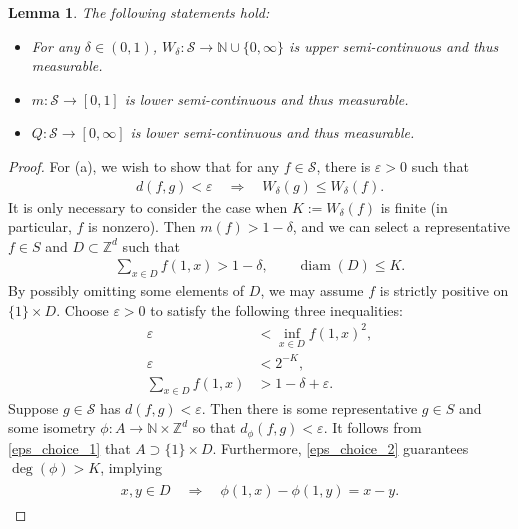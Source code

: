 \documentclass[11pt,reqno]{amsart}
\numberwithin{equation}{section}
\newtheorem{lemma}[thm]{Lemma}
\theoremstyle{definition}
\begin{document}
\begin{lemma} \label{more_equivalences}
The following statements hold:
\begin{itemize}
\item[(a)] For any $\delta \in (0,1)$, $W_\delta: {\mathcal{S}} \to {\mathbb{N}} \cup \{0,\infty\}$ is upper semi-continuous and thus measurable.
\item[(b)] $m : {\mathcal{S}} \to [0,1]$ is lower semi-continuous and thus measurable.
\item[(c)] $Q : {\mathcal{S}} \to [0,\infty]$ is lower semi-continuous and thus measurable.
\end{itemize}
\end{lemma}

\begin{proof}
For (a), we wish to show that for any $f \in {\mathcal{S}}$, there is ${\varepsilon} > 0$ such that
{\begin{align*} {
d(f,g) < {\varepsilon} \quad \Rightarrow \quad W_\delta(g) \leq W_\delta(f).
} \end{align*}}
It is only necessary to consider the case when $K := W_\delta(f)$ is finite (in particular, $f$ is nonzero).
Then $m(f) > 1 - \delta$, and we can select a representative $f \in S$ and $D \subset {\mathbb{Z}}^d$ such that
{\begin{align*} {
\sum_{x \in D} f(1,x) > 1 - \delta, \qquad \operatorname{diam}(D) \leq K.
} \end{align*}}
By possibly omitting some elements of $D$, we may assume $f$ is strictly positive on $\{1\} \times D$.
Choose ${\varepsilon} > 0$ to satisfy the following three inequalities:
\begin{align}
{\varepsilon} &< \inf_{x \in D} f(1,x)^2, \label{eps_choice_1} \\
{\varepsilon} &< 2^{-K}, \label{eps_choice_2} \\
\sum_{x \in D} f(1,x) &> 1 - \delta + {\varepsilon}. \label{eps_choice_3}
\end{align}
Suppose $g \in {\mathcal{S}}$ has $d(f,g) < {\varepsilon}$.
Then there is some representative $g \in S$ and some isometry $\phi : A \to {\mathbb{N}} \times {\mathbb{Z}}^d$ so that $d_\phi(f,g) < {\varepsilon}$.
It follows from \eqref{eps_choice_1} that $A \supset \{1\} \times D$.
Furthermore, \eqref{eps_choice_2} guarantees $\deg(\phi) > K$, implying
{\begin{align} \begin{split} {
x,y \in D \quad \Rightarrow \quad \phi(1,x) - \phi(1,y) = x - y. \label{perfect_on_D}
} \end{split} \end{align}}

\end{proof}
\end{document}
